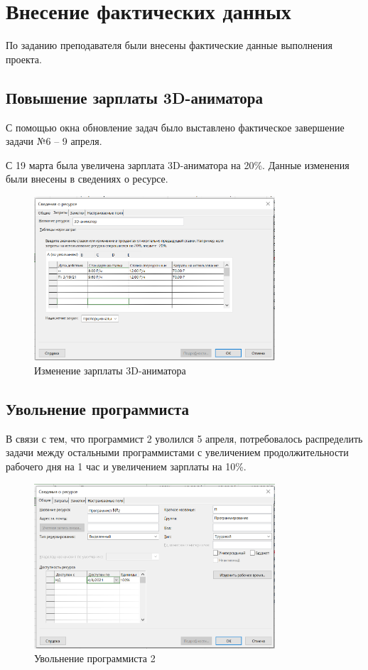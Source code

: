 \section{Внесение фактических данных}

По заданию преподавателя были внесены фактические данные выполнения проекта.

\subsection{Повышение зарплаты 3D-аниматора}

С помощью окна обновление задач было выставлено фактическое завершение задачи №6 -- 9 апреля.

С 19 марта была увеличена зарплата 3D-аниматора на 20\%. Данные изменения были внесены в сведениях о ресурсе.

\begin{figure}[H]
    \centering
    \includegraphics[width=0.8\textwidth]{img/content/1.png}
    \caption{Изменение зарплаты 3D-аниматора}
    \label{fig:1}
\end{figure}

\subsection{Увольнение программиста}

В связи с тем, что программист 2 уволился 5 апреля, потребовалось распределить задачи между остальными программистами с увеличением продолжительности рабочего дня на 1 час и увеличением зарплаты на 10\%.

\begin{figure}[H]
    \centering
    \includegraphics[width=0.8\textwidth]{img/content/2_1.png}
    \caption{Увольнение программиста 2}
    \label{fig:2_1}
\end{figure}

